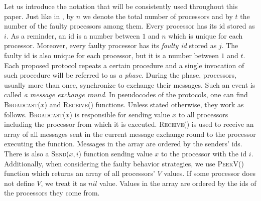 Let us introduce the notation that will be consistently used throughout this paper. Just like in , by $n$ we denote the total number of processors and by $t$ the number of the faulty processors among them. Every processor has its id stored as $i$. As a reminder, an id is a number between $1$ and $n$ which is unique for each processor. Moreover, every faulty processor has its \emph{faulty id} stored as $j$. The faulty id is also unique for each processor, but it is a number between $1$ and $t$. Each proposed protocol repeats a certain procedure and a single invocation of such procedure will be referred to as \emph{a phase}. During the phase, processors, usually more than once, synchronize to exchange their messages. Such an event is called \emph{a message exchange round}. In pseudocodes of the protocols, one can find \textsc{Broadcast($x$)} and \textsc{Receive()} functions. Unless stated otherwise, they work as follows. \textsc{Broadcast($x$)} is responsible for sending value $x$ to all processors including the processor from which it is executed.
\textsc{Receive()} is used to receive an array of all messages sent in the current message exchange round to the processor executing the function. Messages in the array are ordered by the senders' ids. There is also a \textsc{Send($x, i$)} function sending value $x$ to the processor with the id $i$.
Additionally, when considering the faulty behavior strategies, we use \textsc{PeekV()} function which returns an array of all processors' $V$ values. If some processor does not define $V$, we treat it as $nil$ value. Values in the array are ordered by the ids of the processors they come from.